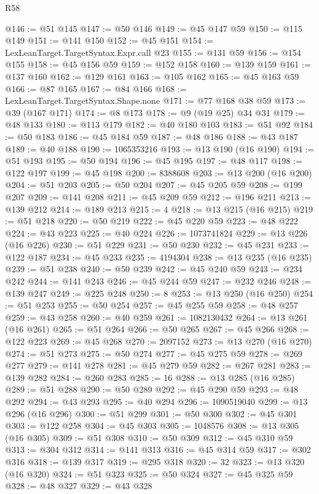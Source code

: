 \begin{lexlean}{R58}
\begin{coremodule}
@146 := @51 @145
@147 := @50 @146
@149 := @45 @147 @59
@150 := @115 @149
@151 := @141 @150
@152 := @45 @151
@154 := LexLeanTarget.TargetSyntax.Expr.call @23
@155 := @131 @59
@156 := @154 @155
@158 := @45 @156 @59
@159 := @152 @158
@160 := @139 @159
@161 := @137 @160
@162 := @129 @161
@163 := @105 @162
@165 := @45 @163 @59
@166 := @87 @165
@167 := @84 @166
@168 := LexLeanTarget.TargetSyntax.Shape.none
@171 := @77 @168 @38 @59
@173 := @39 (@167 @171)
@174 := @8 @173
@178 := @9 (@19 @25) @34 @31
@179 := @48 @133
@180 := @113 @179
@182 := @40 @180 @103
@183 := @51 @92
@184 := @50 @183
@186 := @45 @184 @59
@187 := @48 @186
@188 := @43 @187
@189 := @40 @188
@190 := 1065353216
@193 := @13 @190 (@16 @190)
@194 := @51 @193
@195 := @50 @194
@196 := @45 @195
@197 := @48 @117
@198 := @122 @197
@199 := @45 @198
@200 := 8388608
@203 := @13 @200 (@16 @200)
@204 := @51 @203
@205 := @50 @204
@207 := @45 @205 @59
@208 := @199 @207
@209 := @141 @208
@211 := @45 @209 @59
@212 := @196 @211
@213 := @139 @212
@214 := @189 @213
@215 := 4
@218 := @13 @215 (@16 @215)
@219 := @51 @218
@220 := @50 @219
@222 := @45 @220 @59
@223 := @48 @222
@224 := @43 @223
@225 := @40 @224
@226 := 1073741824
@229 := @13 @226 (@16 @226)
@230 := @51 @229
@231 := @50 @230
@232 := @45 @231
@233 := @122 @187
@234 := @45 @233
@235 := 4194304
@238 := @13 @235 (@16 @235)
@239 := @51 @238
@240 := @50 @239
@242 := @45 @240 @59
@243 := @234 @242
@244 := @141 @243
@246 := @45 @244 @59
@247 := @232 @246
@248 := @139 @247
@249 := @225 @248
@250 := 8
@253 := @13 @250 (@16 @250)
@254 := @51 @253
@255 := @50 @254
@257 := @45 @255 @59
@258 := @48 @257
@259 := @43 @258
@260 := @40 @259
@261 := 1082130432
@264 := @13 @261 (@16 @261)
@265 := @51 @264
@266 := @50 @265
@267 := @45 @266
@268 := @122 @223
@269 := @45 @268
@270 := 2097152
@273 := @13 @270 (@16 @270)
@274 := @51 @273
@275 := @50 @274
@277 := @45 @275 @59
@278 := @269 @277
@279 := @141 @278
@281 := @45 @279 @59
@282 := @267 @281
@283 := @139 @282
@284 := @260 @283
@285 := 16
@288 := @13 @285 (@16 @285)
@289 := @51 @288
@290 := @50 @289
@292 := @45 @290 @59
@293 := @48 @292
@294 := @43 @293
@295 := @40 @294
@296 := 1090519040
@299 := @13 @296 (@16 @296)
@300 := @51 @299
@301 := @50 @300
@302 := @45 @301
@303 := @122 @258
@304 := @45 @303
@305 := 1048576
@308 := @13 @305 (@16 @305)
@309 := @51 @308
@310 := @50 @309
@312 := @45 @310 @59
@313 := @304 @312
@314 := @141 @313
@316 := @45 @314 @59
@317 := @302 @316
@318 := @139 @317
@319 := @295 @318
@320 := 32
@323 := @13 @320 (@16 @320)
@324 := @51 @323
@325 := @50 @324
@327 := @45 @325 @59
@328 := @48 @327
@329 := @43 @328

\end{coremodule}
\end{lexlean}

